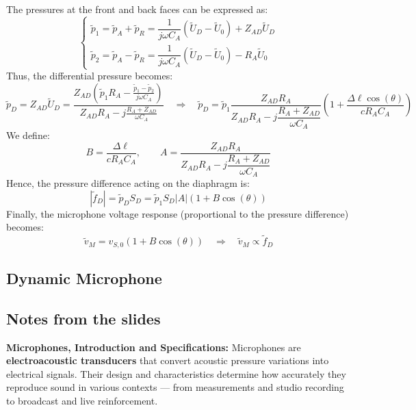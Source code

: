 The pressures at the front and back faces can be expressed as:
\[
\begin{cases}
\tilde{p}_1 = \tilde{p}_A + \tilde{p}_R = \dfrac{1}{j\omega C_A} (\tilde{U}_D - \tilde{U}_0) + Z_{AD} \tilde{U}_D \\
\tilde{p}_2 = \tilde{p}_A - \tilde{p}_R = \dfrac{1}{j\omega C_A} (\tilde{U}_D - \tilde{U}_0) - R_A \tilde{U}_0
\end{cases}
\]
Thus, the differential pressure becomes:
\[
\tilde{p}_D = Z_{AD} \tilde{U}_D = \frac{Z_{AD} \left( \tilde{p}_1R_A - \frac{\tilde{p}_1 - \tilde{p}_2}{j \omega C_A}\right)}{Z_{AD}R_A - j \frac{R_A + Z_{AD}}{\omega C_A}}
\quad \Rightarrow \quad
\tilde{p}_D = \tilde{p}_1 \frac{Z_{AD} R_A}{Z_{AD} R_A - j \dfrac{R_A + Z_{AD}}{\omega C_A}}
 \left( 1 + \frac{\Delta \ell \cos(\theta)}{c R_A C_A} \right)
\]
We define:
\[
B = \frac{\Delta \ell}{c R_A C_A}, \qquad A = \frac{Z_{AD} R_A}{Z_{AD} R_A - j \dfrac{R_A + Z_{AD}}{\omega C_A}}
\]
Hence, the pressure difference acting on the diaphragm is:
\[
|\tilde{f}_D| = \tilde{p}_D S_D = \tilde{p}_1 S_D|A| (1 + B\cos(\theta))
\]
Finally, the microphone voltage response (proportional to the pressure difference) becomes:
\[
\tilde{v}_M = v_{S,0} (1 + B\cos(\theta)) 
\quad \Rightarrow \quad
\tilde{v}_M \propto \tilde{f}_D 
\]





\subsection{Dynamic Microphone}

\clearpage



\subsection{Notes from the slides}

\textbf{Microphones, Introduction and Specifications: }
Microphones are \textbf{electroacoustic transducers} that convert acoustic pressure variations into electrical signals.  
Their design and characteristics determine how accurately they reproduce sound in various contexts — from measurements and studio recording to broadcast and live reinforcement.

